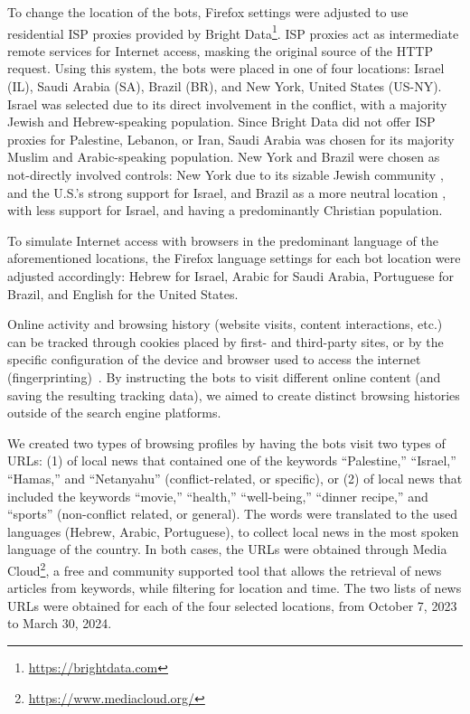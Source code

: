  To change the location of the bots, Firefox settings were adjusted to use residential ISP proxies provided by Bright Data\footnote{\url{https://brightdata.com}}. %
ISP proxies act as intermediate remote services for Internet access, masking the original source of the HTTP request. Using this system, the bots were placed in one of four locations: Israel (IL), Saudi Arabia (SA), Brazil (BR), and New York, United States (US-NY). Israel was selected due to its direct involvement in the conflict, with a majority Jewish and Hebrew-speaking population. Since Bright Data did not offer ISP proxies for Palestine, Lebanon, or Iran, Saudi Arabia was chosen for its majority Muslim and Arabic-speaking population. New York and Brazil were chosen as not-directly involved controls: New York due to its sizable Jewish community \cite{pew2015religious}, and the U.S.'s strong support for Israel, and Brazil as a more neutral location \cite{pew2013brazil}, with less support for Israel, and having a predominantly Christian population.

 To simulate Internet access with browsers in the predominant language of the aforementioned locations, the Firefox language settings for each bot location were adjusted accordingly: Hebrew for Israel, Arabic for Saudi Arabia, Portuguese for Brazil, and English for the United States.

 Online activity and browsing history (website visits, content interactions, etc.) can be tracked through cookies placed by first- and third-party sites, or by the specific configuration of the device and browser used to access the internet (fingerprinting)~\cite{cookiless_monster, stop_tracking_me_bro, webbrowsing_fingerprinting}. By instructing the bots to visit different online content (and saving the resulting tracking data), we aimed to create distinct browsing histories outside of the search engine platforms.

We created two types of browsing profiles by having the bots visit two types of URLs: (1) of local news that contained one of the keywords ``Palestine,'' ``Israel,'' ``Hamas,'' and ``Netanyahu'' (conflict-related, or specific), or (2) of local news that included the keywords ``movie,'' ``health,'' ``well-being,'' ``dinner recipe,'' and ``sports'' (non-conflict related, or general). The words were translated to the used languages (Hebrew, Arabic, Portuguese), to collect local news in the most spoken language of the country.
In both cases, the URLs were obtained through Media Cloud\footnote{\url{https://www.mediacloud.org/}}, a free and community supported tool that allows the retrieval of news articles from keywords, while filtering for location and time. The two lists of news URLs were obtained for each of the four selected locations, from October 7, 2023 to March 30, 2024.

